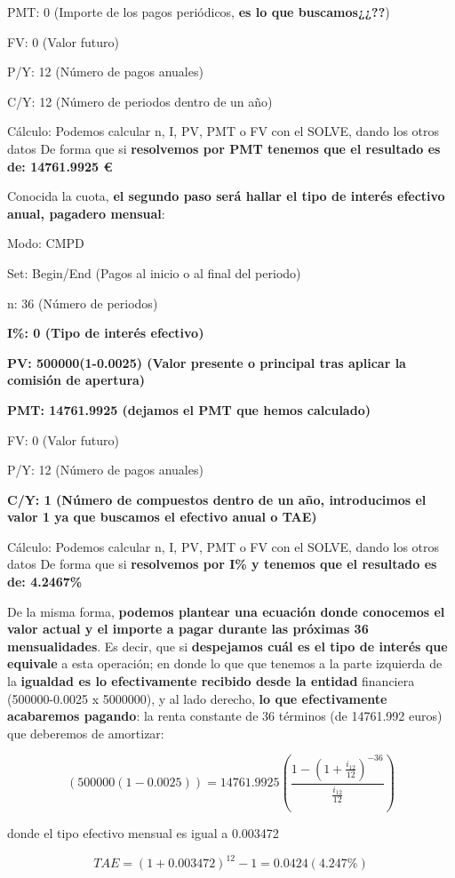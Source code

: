 \documentclass[
  letterpaper,
  DIV=11,
  numbers=noendperiod]{scrartcl}
\begin{document}
\begin{tcolorbox}
PMT: 0 (Importe de los pagos periódicos, \textbf{es lo que
buscamos¿¿??})

FV: 0 (Valor futuro)

P/Y: 12 (Número de pagos anuales)

C/Y: 12 (Número de periodos dentro de un año)

Cálculo: Podemos calcular n, I, PV, PMT o FV con el SOLVE, dando los
otros datos De forma que si \textbf{resolvemos por PMT tenemos que el
resultado es de: 14761.9925 €}

Conocida la cuota, \textbf{el segundo paso será hallar el tipo de
interés efectivo anual, pagadero mensual}:

Modo: CMPD

Set: Begin/End (Pagos al inicio o al final del periodo)

n: 36 (Número de periodos)

\textbf{I\%: 0 (Tipo de interés efectivo)}

\textbf{PV: 500000(1-0.0025) (Valor presente o principal tras aplicar la
comisión de apertura)}

\textbf{PMT: 14761.9925 (dejamos el PMT que hemos calculado)}

FV: 0 (Valor futuro)

P/Y: 12 (Número de pagos anuales)

\textbf{C/Y: 1 (Número de compuestos dentro de un año, introducimos el
valor 1 ya que buscamos el efectivo anual o TAE)}

Cálculo: Podemos calcular n, I, PV, PMT o FV con el SOLVE, dando los
otros datos De forma que si \textbf{resolvemos por I\% y tenemos que el
resultado es de: 4.2467\%}

De la misma forma, \textbf{podemos plantear una ecuación donde conocemos
el valor actual y el importe a pagar durante las próximas 36
mensualidades}. Es decir, que si \textbf{despejamos cuál es el tipo de
interés que equivale} a esta operación; en donde lo que que tenemos a la
parte izquierda de la \textbf{igualdad es lo efectivamente recibido
desde la entidad} financiera (500000-0.0025 x 5000000), y al lado
derecho, \textbf{lo que efectivamente acabaremos pagando}: la renta
constante de 36 términos (de 14761.992 euros) que deberemos de
amortizar:

\[\left(500000\left(1-0.0025\right)\right)=14761.9925\left(\frac{1-\left(1+\frac{i_{12}}{12}\right)^{-36}}{\frac{i_{12}}{12}}\right)\]

donde el tipo efectivo mensual es igual a 0.003472

\[TAE=(1+0.003472)^{12}-1=0.0424(4.247\%)\]

\end{tcolorbox}
\end{document}
